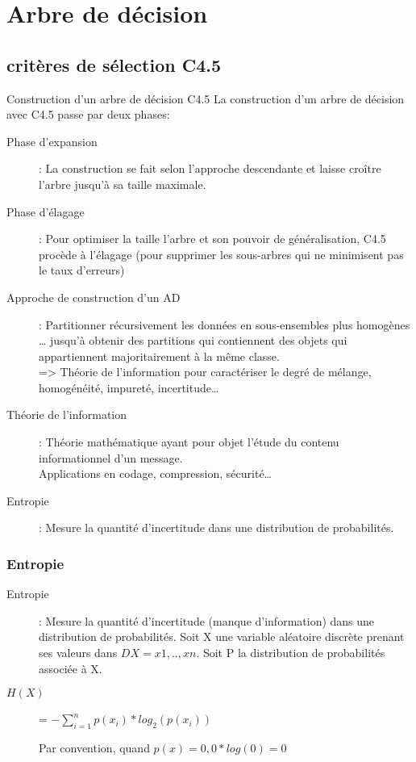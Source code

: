 \chapter{Arbre de décision}
\section{critères de sélection C4.5}

Construction d’un arbre de décision C4.5  La construction d'un arbre de décision avec C4.5 passe par deux phases:  
\begin{description}
\item[Phase d'expansion]: La construction se fait selon l'approche descendante et laisse croître l'arbre jusqu'à sa taille maximale.  
\item[Phase d'élagage]: Pour optimiser la taille l'arbre et son pouvoir de généralisation, C4.5 procède à l'élagage (pour supprimer les sous-arbres qui ne minimisent pas le taux d'erreurs)
\item[Approche de construction d’un AD]: Partitionner récursivement les données en sous-ensembles plus homogènes  … jusqu’à obtenir des partitions qui contiennent des objets qui appartiennent majoritairement à la même classe. \\
=> Théorie de l’information pour caractériser le degré de mélange, homogénéité, impureté, incertitude…
\item[Théorie de l’information]: Théorie mathématique ayant pour objet l’étude du contenu informationnel d’un message. \\
 Applications en codage, compression, sécurité… 
\item[Entropie]: Mesure la quantité d’incertitude dans une distribution de probabilités.
\end{description}

\subsection{Entropie}
\begin{description}
\item[Entropie]: Mesure la quantité d’incertitude (manque d’information) dans une distribution de probabilités.   Soit X une variable aléatoire discrète prenant ses valeurs dans $DX={x1,..,xn}$. Soit P la distribution de probabilités associée à X.   
\item[$H(X)$] = $- \sum_{i=1}^n p(x_i) * log_2(p(x_i))$
\item[] Par convention, quand $p(x) = 0, 0*log(0) = 0$
\end{description}

